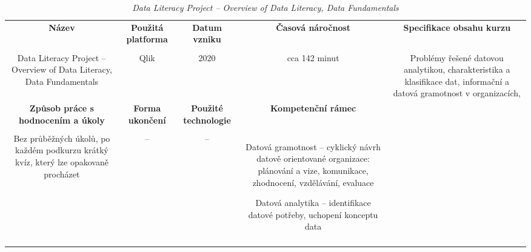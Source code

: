 \begin{landscape}

\begin{table}[htbp]

\renewcommand\thetable{4}

\caption{\textit{Data Literacy Project – Overview of Data Literacy, Data Fundamentals}}\label{tab4}

\footnotesize

{

\justifying

\begin{tabularx}{\linewidth}{CCCCC}

\toprule

\textbf{Název} &

\textbf{Použitá platforma} &

\textbf{Datum vzniku} &

\textbf{Časová náročnost} &
 
\textbf{Specifikace obsahu kurzu}

\\

\tabularnewline
\midrule

Data Literacy Project – Overview of Data Literacy, Data Fundamentals

&

Qlik

&

2020

&

cca 142 minut

&

Problémy řešené datovou analytikou, charakteristika a klasifikace dat, informační a datová gramotnost v organizacích, 

\\
\toprule

\textbf{Způsob práce s hodnocením a úkoly} &

\textbf{Forma ukončení} &

\textbf{Použité technologie} &

\textbf{Kompetenční rámec} 

\\

\tabularnewline
\midrule

Bez průběžných úkolů, po každém podkurzu krátký kvíz, který lze opakovaně procházet

&

–

&

–

&

Datová gramotnost – cyklický návrh datově orientované organizace: plánování a vize, komunikace, zhodnocení, vzdělávání, evaluace

Datová analytika – identifikace datové potřeby, uchopení konceptu data

\\

\tabularnewline
\bottomrule
\end{tabularx}

}

\end{table}

\end{landscape}